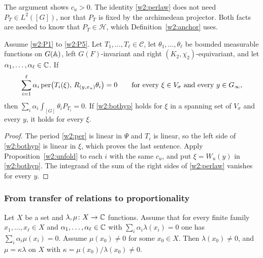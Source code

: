 \begin{remark}\label{w2:rem:perlaw}
The argument shows $c_u>0$. The identity \eqref{w2:perlaw} does not need $P_T\in L^2([G])$, nor that $P_T$ is fixed by the archimedean projector. Both facts are needed to know that $P_T\in\mathcal H$, which Definition~\ref{w2:anchor} uses.
\end{remark}

\begin{corollary}\label{w2:bottom}
Assume \ref{w2:P1} to \ref{w2:P5}. Let $T_1,\dots,T_\ell\in\mathcal C$, let $\theta_1,\dots,\theta_\ell$ be bounded measurable functions on $G(\mathbb A)$, left $G(F)$-invariant and right $(K_2,\overline{\chi_2})$-equivariant, and let $\alpha_1,\dots,\alpha_\ell\in\mathbb C$. If
\begin{equation}\label{w2:bothyp}
\sum_{i=1}^\ell\alpha_i\,\mathrm{per}\bigl(T_i(\xi),\,R_{(y,x_u)}\theta_i\bigr)=0\qquad\text{for every }\xi\in V_\sigma\text{ and every }y\in G_\infty,
\end{equation}
then $\sum_i\alpha_i\int_{[G]}\theta_iP_{T_i}=0$. If \eqref{w2:bothyp} holds for $\xi$ in a spanning set of $V_\sigma$ and every $y$, it holds for every $\xi$.
\end{corollary}

\begin{proof}
The period \eqref{w2:per} is linear in $\Psi$ and $T_i$ is linear, so the left side of \eqref{w2:bothyp} is linear in $\xi$, which proves the last sentence. Apply Proposition~\ref{w2:unfold} to each $i$ with the same $c_u$, and put $\xi=W_u(y)$ in \eqref{w2:bothyp}. The integrand of the sum of the right sides of \eqref{w2:perlaw} vanishes for every $y$.
\end{proof}

\subsubsection{From transfer of relations to proportionality}\label{w2:sec:prop}

\begin{lemma}\label{w2:prop}
Let $X$ be a set and $\lambda,\mu\colon X\to\mathbb C$ functions. Assume that for every finite family $x_1,\dots,x_\ell\in X$ and $\alpha_1,\dots,\alpha_\ell\in\mathbb C$ with $\sum_i\alpha_i\lambda(x_i)=0$ one has $\sum_i\alpha_i\mu(x_i)=0$. Assume $\mu(x_0)\ne0$ for some $x_0\in X$. Then $\lambda(x_0)\ne0$, and $\mu=\kappa\lambda$ on $X$ with $\kappa=\mu(x_0)/\lambda(x_0)\ne0$.
\end{lemma}

